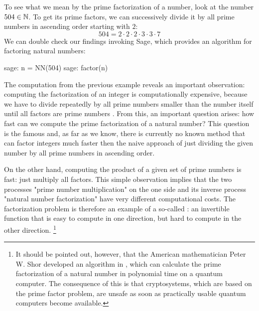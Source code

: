 \begin{example}\label{ex-prime-factorization} To see what we mean by the prime factorization of a number,  look at the number $504\in\mathbb{N}$. To get its prime factors, we can successively divide it by all prime numbers in ascending order starting with $2$:
\begin{equation*}
504 = 2\cdot 2\cdot 2\cdot 3\cdot 3\cdot 7
\end{equation*}
We can double check our findings invoking Sage, which provides an algorithm for factoring natural numbers:
\begin{sagecommandline}
sage: n = NN(504)
sage: factor(n)
\end{sagecommandline}
\end{example}
The computation from the previous example reveals an important observation: computing the factorization of an integer is computationally expensive, because we have to divide repeatedly by all prime numbers smaller than the number itself until all factors are prime numbers . From this, an important question arises: how fast can we compute the prime factorization of a natural number? This question is the famous  and, as far as we know, there is currently no known method that can factor integers much faster then the naive approach of just dividing the given number by all prime numbers in ascending order.

On the other hand, computing the product of a given set of prime numbers is fast:  just multiply all factors. This simple observation implies that the two processes "prime number multiplication" on the one side and its inverse process "natural number factorization" have very different computational costs. The factorization problem is therefore an example of a so-called : an invertible function that is easy to compute in one direction, but hard to compute in the other direction.
\footnote{It should be pointed out, however, that the American mathematician Peter W. Shor developed an algorithm in \citeyear{shor94}, which can calculate the prime factorization of a natural number in polynomial time on a quantum computer. The consequence of this is that cryptosystems, which are based on the prime factor problem, are unsafe as soon as practically usable quantum computers become available.}

